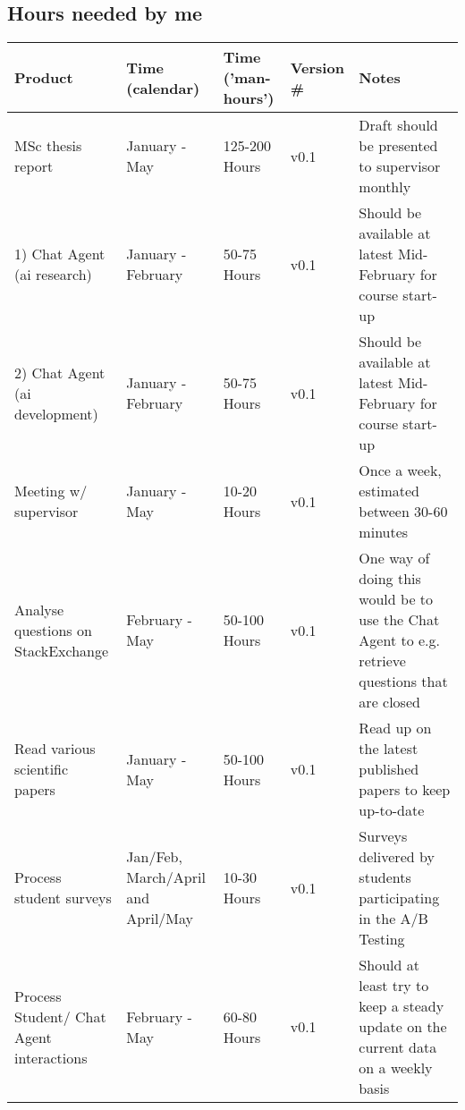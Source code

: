 \subsection{Hours needed by me}
\label{chapter5:hours_needed_by_me}
\begin{center}
	\begin{tabular}{| p{4cm} | p{2.5cm} | l |  l | p{4cm} |}
		\hline
		Product & Time (calendar) & Time ('man-hours')\footnotemark & Version \# & Notes  \\
		\hline
		MSc thesis report & January - May & 125-200 Hours & v0.1 & Draft should be presented to supervisor monthly \\ 
		\hline
		1) Chat Agent \newline (\gls{ai} research) & January - \newline February & 50-75 Hours & v0.1 &  Should be available at \newline latest Mid-February for 
		\newline course start-up \\ 
		\hline
		2) Chat Agent \newline (\gls{ai} development) & January -\newline  February & 50-75 Hours & v0.1 & Should be available at \newline latest Mid-February for 
		\newline course start-up \\ 
		\hline
		Meeting w/ supervisor & January - May & 10-20 Hours & v0.1 & Once a week, estimated between 30-60 minutes \\ 
		\hline
		Analyse questions \newline on StackExchange & February - May & 50-100 Hours & v0.1 & One way of doing this \newline would be to use the 
		\newline Chat Agent to e.g. \newline retrieve questions \newline that are closed \\ 
		\hline
		Read various scientific \newline papers & January - May & 50-100 Hours & v0.1 & Read up on the latest \newline published papers to keep up-to-date \\ 
		\hline
		Process student surveys & Jan/Feb, March/April and April/May & 10-30 Hours & v0.1 & Surveys delivered by \newline students participating in \newline the A/B Testing \\ 
		\hline
		Process Student/ \newline Chat Agent interactions & February - May & 60-80 Hours & v0.1 & Should at least try to 
		\newline keep a steady update on \newline the current data on \newline a weekly basis \\ 
		\hline
	\end{tabular}
\end{center}
	
